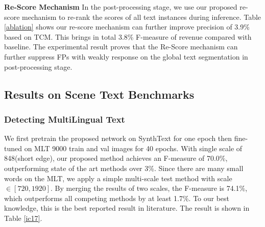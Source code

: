 \documentclass[letterpaper]{article} \usepackage{aaai19}  \usepackage{times}  \usepackage{helvet}  \usepackage{courier}  \usepackage{url}  \usepackage{graphicx}
\begin{document}
\textbf{Re-Score Mechanism}
In the post-processing stage, we use our proposed re-score mechanism to re-rank the scores of all text instances during inference.
Table \ref{ablation} shows our re-score mechanism can further improve precision of 3.9\% based on TCM.
This brings in total 3.8\% F-measure of revenue compared with baseline.
The experimental result proves that the Re-Score mechanism can further suppress FPs with weakly response on the global text segmentation in post-processing stage. 


\subsection{Results on Scene Text Benchmarks}
\subsubsection{Detecting MultiLingual Text } 
We first pretrain the proposed network on SynthText for one epoch then fine-tuned on MLT 9000 train and val images for 40 epochs. 
With single scale of 848(short edge), our proposed method achieves an F-measure of 70.0\%, outperforming state of the art methods over 3\%.
 Since there are many small words on the MLT, we apply a simple multi-scale test method with scale $\in [720,1920]$. By merging the results of two scales, the F-measure is 74.1\%, which outperforms all competing methods by at least 1.7\%.  
To our best knowledge, this is the best reported result in literature.
The result is shown in Table \ref{ic17}.





\begin{table}[htb]
\center
{}
\caption{\label{ic17}Effectiveness of several methods on ICDAR2017 MLT incidental scene text location task. $^*$ means multi scale test.}
\end{table}
\end{document}
